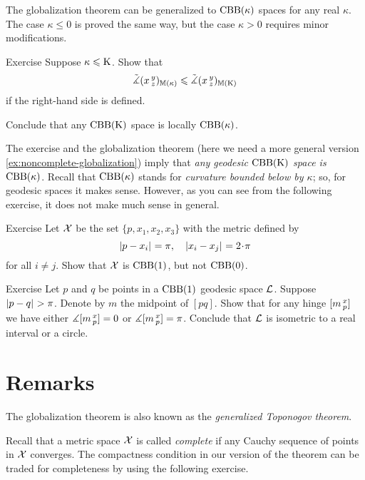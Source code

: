The globalization theorem  can be generalized to $\mathrm{CBB}(\kappa)$ spaces for any real $\kappa$.
The case $\kappa\le 0$ is proved the same way, but the case $\kappa>0$ requires minor modifications.

\begin{thm}{Exercise}\label{ex:mono-mod-angle}
Suppose $\kappa\leqslant \mathrm{K}$.
Show that 
\[\tilde\measuredangle(x\,{}^{y}_{z})_{\mathbb{M}(\kappa)}\leqslant \tilde\measuredangle(x\,{}^{y}_{z})_{\mathbb{M}(\mathrm{K})}\]
if the right-hand side is defined.

Conclude that any $\mathrm{CBB}(\mathrm{K})$ space is locally $\mathrm{CBB}(\kappa)$.
\end{thm}

The exercise and the globalization theorem (here we need a more general version \ref{ex:noncomplete-globalization}) imply that \textit{any geodesic $\mathrm{CBB}(\mathrm{K})$ space is  $\mathrm{CBB}(\kappa)$}.
Recall that $\mathrm{CBB}(\kappa)$ stands for \textit{curvature bounded below by $\kappa$}; so, for geodesic spaces it makes sense.
However, as you can see from the following exercise, it does not make much sense in general.

\begin{thm}{Exercise}\label{ex:CBB(1)notitCBB(0)}
Let $\mathcal{X}$ be the set $\{p,x_1,x_2,x_3\}$ with the metric defined by
\[\dist{p}{x_i}{}=\pi,\quad\dist{x_i}{x_j}{}=2\cdot\pi\]
for all $i\ne j$.
Show that $\mathcal{X}$ is $\mathrm{CBB}(1)$, but not $\mathrm{CBB}(0)$.
\end{thm}

\begin{thm}{Exercise}\label{ex:RisCBB(1)}
Let $p$ and $q$ be points in a $\mathrm{CBB}(1)$ geodesic space $\mathcal{L}$.
Suppose $\dist{p}{q}{}>\pi$.
Denote by $m$ the midpoint of $[pq]$.
Show that for any hinge $[m\,{}^{x}_{p}]$ we have
either $\measuredangle[m\,{}^{x}_{p}]=0$ or $\measuredangle[m\,{}^{x}_{p}]=\pi$.
Conclude that $\mathcal{L}$ is isometric to a real interval or a circle.

\end{thm}


\section{Remarks} 

The globalization theorem is also known as the \textit{generalized Toponogov theorem}.

Recall that a metric space $\mathcal{X}$ is called \emph{complete} if any Cauchy sequence of points in $\mathcal{X}$ converges.
The compactness condition in our version of the theorem can be traded for completeness by using the following exercise.

